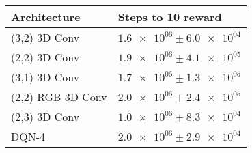 \begin{tabular}{ll}
\hline
 Architecture      & Steps to 10 reward                \\
\hline
 (3,2) 3D Conv     & $\num{1.6e+06} \pm \num{6.0e+04}$ \\
 (2,2) 3D Conv     & $\num{1.9e+06} \pm \num{4.1e+05}$ \\
 (3,1) 3D Conv     & $\num{1.7e+06} \pm \num{1.3e+05}$ \\
 (2,2) RGB 3D Conv & $\num{2.0e+06} \pm \num{2.4e+05}$ \\
 (2,3) 3D Conv     & $\num{1.0e+06} \pm \num{8.3e+04}$ \\
 DQN-4             & $\num{2.0e+06} \pm \num{2.9e+04}$ \\
\hline
\end{tabular}